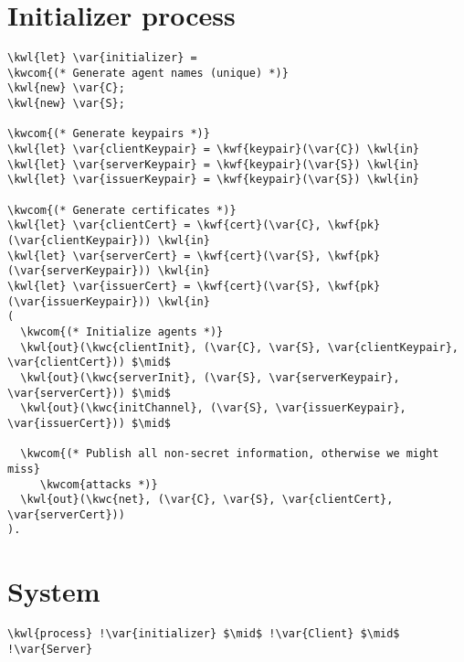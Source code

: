 \section{Initializer process}
\begin{Verbatim}[commandchars=\\\{\}, codes={\catcode`$=3}]
\kwl{let} \var{initializer} = 
\kwcom{(* Generate agent names (unique) *)}
\kwl{new} \var{C};
\kwl{new} \var{S};

\kwcom{(* Generate keypairs *)}
\kwl{let} \var{clientKeypair} = \kwf{keypair}(\var{C}) \kwl{in}
\kwl{let} \var{serverKeypair} = \kwf{keypair}(\var{S}) \kwl{in}
\kwl{let} \var{issuerKeypair} = \kwf{keypair}(\var{S}) \kwl{in}

\kwcom{(* Generate certificates *)}
\kwl{let} \var{clientCert} = \kwf{cert}(\var{C}, \kwf{pk}(\var{clientKeypair})) \kwl{in}
\kwl{let} \var{serverCert} = \kwf{cert}(\var{S}, \kwf{pk}(\var{serverKeypair})) \kwl{in}
\kwl{let} \var{issuerCert} = \kwf{cert}(\var{S}, \kwf{pk}(\var{issuerKeypair})) \kwl{in}
(
  \kwcom{(* Initialize agents *)}
  \kwl{out}(\kwc{clientInit}, (\var{C}, \var{S}, \var{clientKeypair}, \var{clientCert})) $\mid$
  \kwl{out}(\kwc{serverInit}, (\var{S}, \var{serverKeypair}, \var{serverCert})) $\mid$
  \kwl{out}(\kwc{initChannel}, (\var{S}, \var{issuerKeypair}, \var{issuerCert})) $\mid$  

  \kwcom{(* Publish all non-secret information, otherwise we might miss}
     \kwcom{attacks *)}
  \kwl{out}(\kwc{net}, (\var{C}, \var{S}, \var{clientCert}, \var{serverCert}))
).
\end{Verbatim}

\section{System}
\begin{Verbatim}[commandchars=\\\{\}, codes={\catcode`$=3}]
\kwl{process} !\var{initializer} $\mid$ !\var{Client} $\mid$ !\var{Server}
\end{Verbatim}
